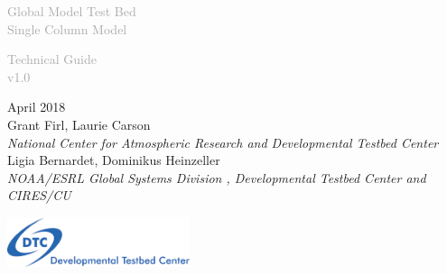 \begin{titlepage}
\renewcommand{\thefootnote}{\fnsymbol{footnote}}

\vspace*{0.5em}
\noindent

\begin{center}
\textcolor{darkgray}{\bigsf Global Model Test Bed \\[0.75ex]  Single Column Model\\}
\vspace*{3em}\par

\textcolor{darkgray}{\bigst Technical Guide \\[0.5ex] v1.0}
\vspace*{1em}\par

\large{April 2018}\\[4em]

Grant Firl, Laurie Carson\\
\textit{\small{National Center for Atmospheric Research and Developmental Testbed Center}}\\[4em]

Ligia Bernardet, Dominikus Heinzeller\\
\textit{\small{NOAA/ESRL Global Systems Division , Developmental Testbed Center and CIRES/CU}}\\[4em]

\vspace{4em}

\includegraphics[width=0.4\textwidth]{images/dtc_logo.png}\\[2em]

\end{center}
\end{titlepage}
\pagebreak{}




